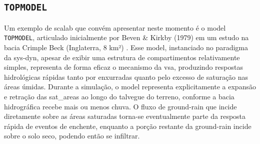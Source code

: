 \documentclass[./main.tex]{subfiles}
\begin{document}
\subsection{\texttt{TOPMODEL}} \label{sec:hydro:topmodel}

\par Um exemplo de \gls{scalab} que convém apresentar neste momento é o \gls{model} \texttt{TOPMODEL}, articulado inicialmente por Beven \& Kirkby (1979) em um estudo na bacia Crimple Beck (Inglaterra, 8 km²) \cite{Beven1979a}. Esse \gls{model}, instanciado no \gls{paradigma} da \gls{sys-dyn}, apesar de exibir uma estrutura de compartimentos relativamente simples, representa de forma eficaz o mecanismo da \gls{vsa}, produzindo respostas hidrológicas rápidas tanto por enxurradas quanto pelo excesso de saturação nas áreas úmidas. Durante a simulação, o \gls{model} representa explicitamente a expansão e retração das \gls{sat_areas} ao longo do talvegue do terreno, conforme a bacia hidrográfica recebe mais ou menos chuva. O fluxo de \gls{ground-rain} que incide diretamente sobre as áreas saturadas torna-se eventualmente parte da resposta rápida de eventos de enchente, enquanto a porção restante da \gls{ground-rain} incide sobre o solo seco, podendo então se infiltrar. 
\end{document}
